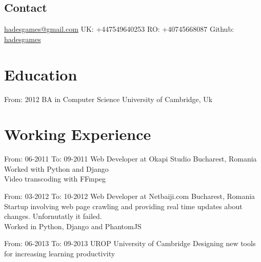 \documentclass[]{friggeri-cv}
\begin{document}
       {}

\begin{aside}
  \section{Contact}
    \href{mailto:hadesgames@gmail.com}{hadesgames@gmail.com}
    UK: +447549640253
    RO: +40745668087
    Github: \href{http://github.com/hadesgames}{hadesgames}
\end{aside}


\section{Education}

\begin{entrylist}
  \entry
    {From: 2012}
    {}
    {BA in Computer Science}
    {}
    {University of Cambridge, Uk}
   
\end{entrylist}

\section{Working Experience}

\begin{entrylist}
  \entry
  {From: 06-2011}
  {To: 09-2011}
  {Web Developer at Okapi Studio}
  {Bucharest, Romania}
  {Worked with Python and Django \\
   Video transcoding with FFmpeg}

  \entry
  {From: 03-2012}
  {To: 10-2012}
  {Web Developer at Netbaiji.com}
  {Bucharest, Romania}
  {Startup involving web page crawling and providing real time updates about changes. Unfornutatly it failed. \\
   Worked in Python, Django and PhantomJS}

  \entry
  {From: 06-2013} 
  {To: 09-2013}
  {UROP}
  {University of Cambridge}
  {Designing new tools for increasing learning productivity}

  
\end{entrylist}
\end{document}
